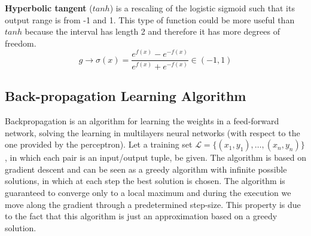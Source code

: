 \textbf{Hyperbolic tangent} ($tanh$) is a rescaling of the logistic sigmoid such that its output range is from -1 and 1. This type of function could be more useful than $tanh$ because the interval has length 2 and therefore it has more degrees of freedom.
$$g \rightarrow \sigma(x) = \frac{e^{f(x)} - e^{-f(x)}}{e^{f(x)} + e^ {-f(x)}} \in (-1, 1)$$



\subsection{Back-propagation Learning Algorithm}
Backpropagation is an algorithm for learning the weights in a feed-forward network, solving the learning in multilayers neural networks (with respect to the one provided by the perceptron). Let a training set $\mathcal{L} = \{(x_1, y_1), \dots, (x_n,y_n) \}$, in which each pair is an input/output tuple, be given. The algorithm is based on gradient descent and can be seen as a greedy algorithm with infinite possible solutions, in which at each step the best solution is chosen. The algorithm is guaranteed to converge only to a local maximum and during the execution we move along the gradient through a predetermined step-size. This property is due to the fact that this algorithm is just an approximation based on a greedy solution.


